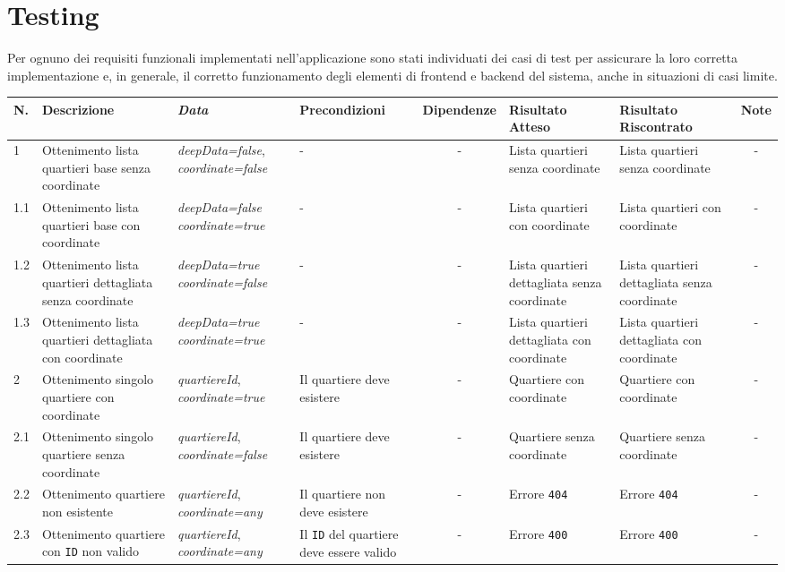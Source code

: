 \section{Testing}

    Per ognuno dei requisiti funzionali implementati nell'applicazione sono stati individuati dei casi di test per assicurare la loro corretta implementazione e, in generale, il corretto funzionamento degli elementi di frontend e backend del sistema, anche in situazioni di casi limite.
    \begin{table}[H]
        \footnotesize
        \centering
        \begin{tabularx}{\textwidth}{|l|X|X|X|c|X|X|c|}
            \hline
            \textbf{N.} & \textbf{Descrizione} & \textbf{\textit{Data}} & \textbf{Precondizioni} & \textbf{Dipendenze} & \textbf{Risultato Atteso} & \textbf{Risultato Riscontrato} & \textbf{Note} \\
            \hline
            1 & Ottenimento lista quartieri base senza coordinate & \textit{deepData=false}, \textit{coordinate=false} & - & - & Lista quartieri senza coordinate & Lista quartieri senza coordinate & - \\
            \hline
            1.1 & Ottenimento lista quartieri base con coordinate & \textit{deepData=false} \textit{coordinate=true} & - & - & Lista quartieri con coordinate & Lista quartieri con coordinate & - \\
            \hline
            1.2 & Ottenimento lista quartieri dettagliata senza coordinate & \textit{deepData=true} \textit{coordinate=false} & - & - & Lista quartieri dettagliata senza coordinate & Lista quartieri dettagliata senza coordinate & - \\
            \hline
            1.3 & Ottenimento lista quartieri dettagliata con coordinate & \textit{deepData=true} \textit{coordinate=true} & - & - & Lista quartieri dettagliata con coordinate & Lista quartieri dettagliata con coordinate & - \\
            \hline
            2 & Ottenimento singolo quartiere con coordinate & \textit{quartiereId}, \textit{coordinate=true} & Il quartiere deve esistere & - & Quartiere con coordinate & Quartiere con coordinate & - \\
            \hline
            2.1 & Ottenimento singolo quartiere senza coordinate & \textit{quartiereId}, \textit{coordinate=false} & Il quartiere deve esistere & - & Quartiere senza coordinate & Quartiere senza coordinate & - \\
            \hline
            2.2 & Ottenimento quartiere non esistente & \textit{quartiereId}, \textit{coordinate=any} & Il quartiere non deve esistere & - & Errore \texttt{404} & Errore \texttt{404} & - \\
            \hline
            2.3 & Ottenimento quartiere con \texttt{ID} non valido & \textit{quartiereId}, \textit{coordinate=any} & Il \texttt{ID} del quartiere deve essere valido & - & Errore \texttt{400} & Errore \texttt{400} & - \\
            \hline
        \end{tabularx}
    \end{table}